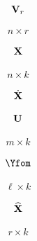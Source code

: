 \documentclass[12 pt]{article}
\begin{document}
\begin{align*}
    \mathbf{V}_r
\end{align*}

\begin{align*}
    n \times r
\end{align*}

\begin{align*}
    \mathbf{X}
\end{align*}

\begin{align*}
    n \times k
\end{align*}

\begin{align*}
    \dot{\mathbf{X}}
\end{align*}

\begin{align*}
    \mathbf{U}
\end{align*}

\begin{align*}
    m \times k
\end{align*}

\begin{align*}
    \Yfom
\end{align*}

\begin{align*}
    \ell \times k
\end{align*}

\begin{align*}
    \widehat{\mathbf{X}}
\end{align*}

\begin{align*}
    r \times k
\end{align*}
\end{document}
